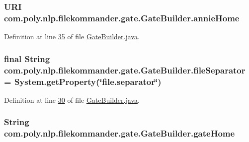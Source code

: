 \hypertarget{classcom_1_1poly_1_1nlp_1_1filekommander_1_1gate_1_1_gate_builder_a4f34ff5f89a6a8a2ddcc72935cb6f51d}{
\subsubsection[{annie\-Home}]{\setlength{\rightskip}{0pt plus 5cm}U\-R\-I com.\-poly.\-nlp.\-filekommander.\-gate.\-Gate\-Builder.\-annie\-Home\hspace{0.3cm}{\ttfamily [private]}}}\label{classcom_1_1poly_1_1nlp_1_1filekommander_1_1gate_1_1_gate_builder_a4f34ff5f89a6a8a2ddcc72935cb6f51d}


Definition at line \hyperlink{L35}{35} of file \hyperlink{}{Gate\-Builder.\-java}.

\hypertarget{classcom_1_1poly_1_1nlp_1_1filekommander_1_1gate_1_1_gate_builder_aca691fb8ad715fd61ccf5845647c7bf2}{
\subsubsection[{file\-Separator}]{\setlength{\rightskip}{0pt plus 5cm}final String com.\-poly.\-nlp.\-filekommander.\-gate.\-Gate\-Builder.\-file\-Separator = System.\-get\-Property(\char`\"{}file.\-separator\char`\"{})\hspace{0.3cm}{\ttfamily [private]}}}\label{classcom_1_1poly_1_1nlp_1_1filekommander_1_1gate_1_1_gate_builder_aca691fb8ad715fd61ccf5845647c7bf2}


Definition at line \hyperlink{L30}{30} of file \hyperlink{}{Gate\-Builder.\-java}.

\hypertarget{classcom_1_1poly_1_1nlp_1_1filekommander_1_1gate_1_1_gate_builder_abdefcfc6edae8b7edf26f0381ed9da34}{
\subsubsection[{gate\-Home}]{\setlength{\rightskip}{0pt plus 5cm}String com.\-poly.\-nlp.\-filekommander.\-gate.\-Gate\-Builder.\-gate\-Home\hspace{0.3cm}{\ttfamily [private]}}}\label{classcom_1_1poly_1_1nlp_1_1filekommander_1_1gate_1_1_gate_builder_abdefcfc6edae8b7edf26f0381ed9da34}



